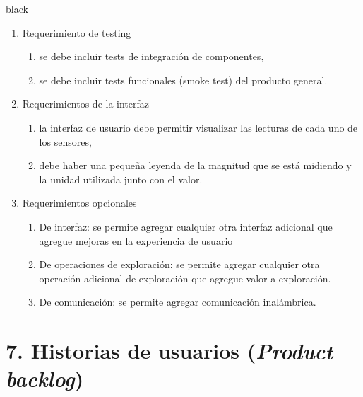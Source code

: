 \documentclass[
11pt, %
]{charter}
\begin{document}
\begin{consigna}{black}
\begin{enumerate}
\begin{enumerate}
		\end{enumerate}	
	\item Requerimiento de testing		
		\begin{enumerate}			
			\item se debe incluir tests de integración de componentes,
			\item se debe incluir tests funcionales (smoke test) del producto general.		
		\end{enumerate}	
	\item Requerimientos de la interfaz		
		\begin{enumerate}			
			\item la interfaz de usuario debe permitir visualizar las lecturas de cada uno de los sensores,			
			\item debe haber una pequeña leyenda de la magnitud que se está midiendo y la unidad utilizada junto con el valor.		
		\end{enumerate}	
	\item Requerimientos opcionales		
		\begin{enumerate}			
			\item De interfaz: se permite agregar cualquier otra interfaz adicional que agregue mejoras en la experiencia de usuario			
			\item De operaciones de exploración: se permite agregar cualquier otra operación adicional de exploración que agregue valor a exploración.	
			\item De comunicación: se permite agregar comunicación inalámbrica.		
	\end{enumerate}
\end{enumerate}




\end{consigna}

\section{7. Historias de usuarios (\textit{Product backlog})}
\label{sec:backlog}
\end{document}
